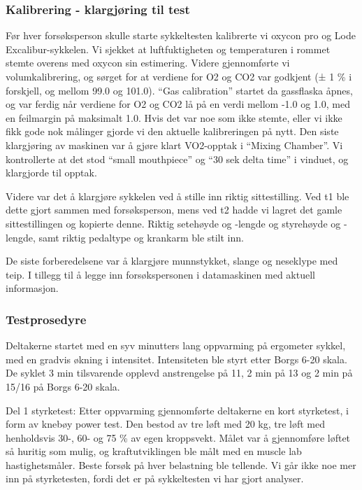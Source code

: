 \documentclass[
  letterpaper,
  DIV=11,
  numbers=noendperiod]{scrartcl}
\begin{document}
\hypertarget{kalibrering---klargjuxf8ring-til-test}{%
\subsubsection{Kalibrering - klargjøring til
test}\label{kalibrering---klargjuxf8ring-til-test}}

Før hver forsøksperson skulle starte sykkeltesten kalibrerte vi oxycon
pro og Lode Excalibur-sykkelen. Vi sjekket at luftfuktigheten og
temperaturen i rommet stemte overens med oxycon sin estimering. Videre
gjennomførte vi volumkalibrering, og sørget for at verdiene for O2 og
CO2 var godkjent (± 1 \% i forskjell, og mellom 99.0 og 101.0). ``Gas
calibration'' startet da gassflaska åpnes, og var ferdig når verdiene
for O2 og CO2 lå på en verdi mellom -1.0 og 1.0, med en feilmargin på
maksimalt 1.0. Hvis det var noe som ikke stemte, eller vi ikke fikk gode
nok målinger gjorde vi den aktuelle kalibreringen på nytt. Den siste
klargjøring av maskinen var å gjøre klart VO2-opptak i ``Mixing
Chamber''. Vi kontrollerte at det stod ``small mouthpiece'' og ``30 sek
delta time'' i vinduet, og klargjorde til opptak.

Videre var det å klargjøre sykkelen ved å stille inn riktig
sittestilling. Ved t1 ble dette gjort sammen med forsøksperson, mens ved
t2 hadde vi lagret det gamle sittestillingen og kopierte denne. Riktig
setehøyde og -lengde og styrehøyde og -lengde, samt riktig pedaltype og
krankarm ble stilt inn.

De siste forberedelsene var å klargjøre munnstykket, slange og neseklype
med teip. I tillegg til å legge inn forsøkspersonen i datamaskinen med
aktuell informasjon.

\hypertarget{testprosedyre}{%
\subsubsection{Testprosedyre}\label{testprosedyre}}

Deltakerne startet med en syv minutters lang oppvarming på ergometer
sykkel, med en gradvis økning i intensitet. Intensiteten ble styrt etter
Borgs 6-20 skala. De syklet 3 min tilsvarende opplevd anstrengelse på
11, 2 min på 13 og 2 min på 15/16 på Borgs 6-20 skala.

Del 1 styrketest: Etter oppvarming gjennomførte deltakerne en kort
styrketest, i form av knebøy power test. Den bestod av tre løft med 20
kg, tre løft med henholdsvis 30-, 60- og 75 \% av egen kroppsvekt. Målet
var å gjennomføre løftet så huritig som mulig, og kraftutviklingen ble
målt med en muscle lab hastighetsmåler. Beste forsøk på hver belastning
ble tellende. Vi går ikke noe mer inn på styrketesten, fordi det er på
sykkeltesten vi har gjort analyser.
\end{document}
